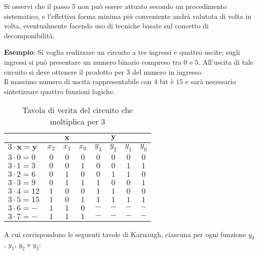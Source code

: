 \documentclass[a4paper]{extarticle}
\renewcommand\arraystretch{}
\begin{document}
\noindent
Si osservi che il passo \(5\) non può essere attuato secondo un procedimento sistematico, e l’effettiva forma minima più conveniente andrà valutata di volta in volta, eventualmente facendo uso di tecniche basate sul concetto di decomponibilità.

\vspace{1em}
\noindent
\textbf{Esempio}: Si voglia realizzare un circuito a tre ingressi e quattro uscite; sugli ingressi si può presentare un numero binario compreso tra $0$ e $5$. All’uscita di tale circuito si deve ottenere il prodotto per \(3\) del numero in ingresso.\\
Il massimo numero di uscita rappresentabile con \(4\) bit è \(15\) e sarà necessario sintetizzare quattro funzioni logiche.

\begin{table}[H]
    \centering
    \setlength{\tabcolsep}{5pt}
    \renewcommand{\arraystretch}{1.1}
    \begin{tabular}{l||ccc|cccc}
         & & $\boldsymbol{x}$ & & & $\boldsymbol{y}$ &\\
         \hline
         \(3 \cdot \boldsymbol{x} = \boldsymbol{y} \) & \(x_2\) & \(x_1\) & \(x_0\) & \(y_3\) & \(y_2\) & \(y_1\) & \(y_0\)\\
         \hline
         $3 \cdot 0 = 0$ & $0$ & $0$ & $0$ & $0$ & $0$ & $0$ & $0$\\
         $3 \cdot 1 = 3$ & $0$ & $0$ & $1$ & $0$ & $0$ & $1$ & $1$\\
         $3 \cdot 2 = 6$ & $0$ & $1$ & $0$ & $0$ & $1$ & $1$ & $0$\\
         $3 \cdot 3 = 9$ & $0$ & $1$ & $1$ & $1$ & $0$ & $0$ & $1$\\
         $3 \cdot 4 = 12$ & $1$ & $0$ & $0$ & $1$ & $1$ & $0$ & $0$\\
         $3 \cdot 5 = 15$ & $1$ & $0$ & $1$ & $1$ & $1$ & $1$ & $1$\\
         $3 \cdot 6 = -$ & $1$ & $1$ & $0$ & $-$ & $-$ & $-$ & $-$\\
         $3 \cdot 7 = -$ & $1$ & $1$ & $1$ & $-$ & $-$ & $-$ & $-$\\
    \end{tabular}
    \caption{Tavola di verita del circuito che moltiplica per $3$}
    \label{tab:tavola_verita_circuito_moltiplica_per_3}
\end{table}

\noindent
A cui corrispondono le seguenti tavole di Karnaugh, ciascuna per ogni funzione $y_0$, $y_1$, $y_2$ e $y_3$:
\end{document}
